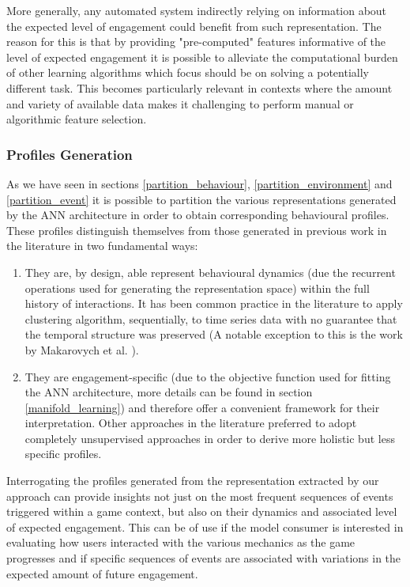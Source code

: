 More generally, any automated system indirectly relying on information about the expected level of engagement could benefit from such representation. The reason for this is that by providing "pre-computed" features informative of the level of expected engagement it is possible to alleviate the computational burden of other learning algorithms which focus should be on solving a potentially different task. This becomes particularly relevant in contexts where the amount and variety of available data makes it challenging to perform manual or algorithmic feature selection.

\subsubsection{Profiles Generation}
As we have seen in sections \ref{partition_behaviour}, \ref{partition_environment} and \ref{partition_event} it is possible to partition the various representations generated by the ANN architecture in order to obtain corresponding behavioural profiles. These profiles distinguish themselves from those generated in previous work in the literature \cite{drachen2014comparison, bauckhage2012players, makarovych2018like, aung2018predicting} in two fundamental ways:

\begin{enumerate}
    \item They are, by design, able represent behavioural dynamics (due the recurrent operations used for generating the representation space) within the full history of interactions. It has been common practice in the literature to apply clustering algorithm, sequentially, to time series data \cite{sifa2013behavior,bauckhage2014beyond,aung2018predicting} with no guarantee that the temporal structure was preserved (A notable exception to this is the work by Makarovych et al. \cite{makarovych2018like}).
    \item They are engagement-specific (due to the objective function used for fitting the ANN architecture, more details can be found in section \ref{manifold_learning}) and therefore offer a convenient framework for their interpretation. Other approaches in the literature preferred to adopt completely unsupervised approaches \cite{drachen2014comparison, drachen2012guns} in order to derive more holistic but less specific profiles.
\end{enumerate}

Interrogating the profiles generated from the representation extracted by our approach can provide insights not just on the most frequent sequences of events triggered within a game context, but also on their dynamics and associated level of expected engagement. This can be of use if the model consumer is interested in evaluating how users interacted with the various mechanics as the game progresses \cite{sifa2013behavior, makarovych2018like} and if specific sequences of events are associated with variations in the expected amount of future engagement. 

